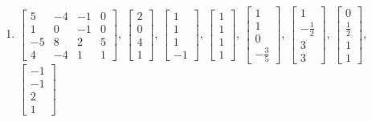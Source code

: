 \begin{exercise}
\begin{enumerate}
\item \(\begin{bmatrix} 5&-4&-1&0\\ 1&0&-1&0\\ -5&8&2&5\\ 4&-4&1&1 \end{bmatrix}\),\quad
\(\begin{bmatrix}2\\0\\4\\1\end{bmatrix}\), \(\begin{bmatrix}1\\1\\1\\-1\end{bmatrix}\), \(\begin{bmatrix}1\\1\\1\\1\end{bmatrix}\), \(\begin{bmatrix}1\\1\\0\\-\frac35\end{bmatrix}\), \(\begin{bmatrix}1\\-\frac12\\3\\3\end{bmatrix}\), \(\begin{bmatrix}0\\\frac12\\1\\1\end{bmatrix}\), \(\begin{bmatrix}-1\\-1\\2\\1\end{bmatrix}\)
\end{enumerate}
\end{exercise}




